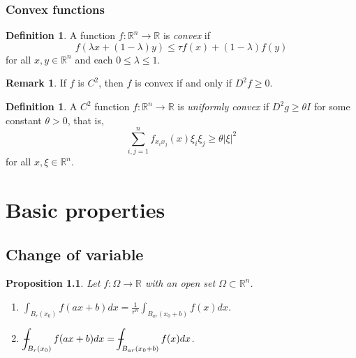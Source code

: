 \documentclass[11pt,a4paper]{report}
\newtheorem{proposition}[theorem]{Proposition}
\theoremstyle{definition}
\newtheorem{definition}[theorem]{Definition}
\newtheorem{remark}[theorem]{Remark}
\def\Xint#1{\mathchoice
{\XXint\displaystyle\textstyle{#1}}%
{\XXint\textstyle\scriptstyle{#1}}%
{\XXint\scriptstyle\scriptscriptstyle{#1}}%
{\XXint\scriptscriptstyle\scriptscriptstyle{#1}}%
\!\int}
\def\XXint#1#2#3{{\setbox0=\hbox{$#1{#2#3}{\int}$}
\vcenter{\hbox{$#2#3$}}\kern-.5\wd0}}
\def\dashint{\Xint-}
\begin{document}
\subsection{Convex functions}

\begin{definition}
	A function $f: \mathbb{R}^n \rightarrow \mathbb{R}$ is \emph{convex} if 
	\begin{equation*} 
		f(\lambda x+(1-\lambda) y) \leq \tau f(x)+(1-\lambda) f(y)
	\end{equation*}
	for all $x, y \in \mathbb{R}^n$ and each $0 \leq \lambda\leq 1$.
\end{definition}

\begin{remark}
	If $f$ is $C^2$, then $f$ is convex if and only if $D^2 f \geq 0$.
\end{remark}

\begin{definition}
	A $C^2$ function $f:\mathbb{R}^{n} \to \mathbb{R}$ is \emph{uniformly convex} if $D^2 g \geq \theta I$  for some constant $\theta > 0$, that is, 
	\begin{equation*} 
		\sum_{i, j=1}^n f_{x_i x_j}(x) \xi_i \xi_j \geq \theta|\xi|^2
	\end{equation*}
	for all $x, \xi \in \mathbb{R}^{n}$.
\end{definition}

\chapter{Basic properties}


\section{Change of variable}

\begin{proposition}
	Let $f:\Omega \to \mathbb{R}$ with an open set $\Omega \subset \mathbb{R}^{n}$.
	\begin{enumerate}[label=(\alph*)] 
	\rm\item $\displaystyle \int_{B_r(x_0)} f(ax + b) dx = \frac{1}{r^n}\int_{B_{ar}(x_0 + b)} f(x) dx$.
	\rm\item $\displaystyle \dashint_{B_r(x_0)} f(ax + b) dx = \dashint_{B_{ar}(x_0 + b)} f(x) dx$.
	\end{enumerate}
\end{proposition}
\end{document}
